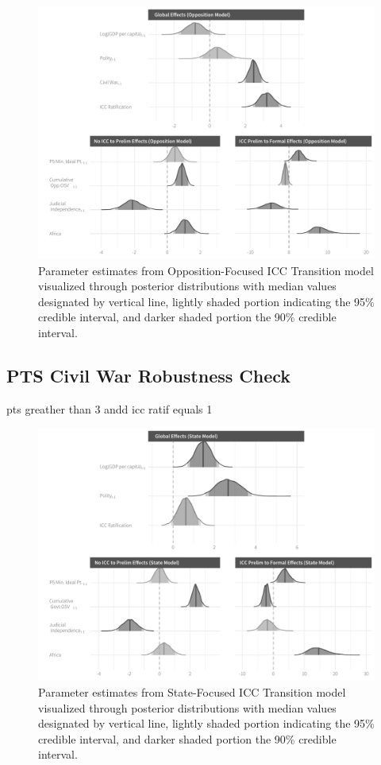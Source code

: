 \begin{figure}
    \centering
    \includegraphics[width=1\textwidth]{rebelCoefSumm_noImp.pdf}
    \caption{Parameter estimates from Opposition-Focused ICC Transition model visualized through posterior distributions with median values designated by vertical line, lightly shaded portion indicating the 95\% credible interval, and darker shaded portion the 90\% credible interval.}
    \label{fig:rebelModel}
\end{figure}

\subsection*{PTS Civil War Robustness Check}

pts greather than 3 andd icc ratif equals 1

\begin{figure}
    \centering
    \includegraphics[width=1\textwidth]{stateCoefSumm_ptsCivilWarOnly.pdf}
    \caption{Parameter estimates from State-Focused ICC Transition model visualized through posterior distributions with median values designated by vertical line, lightly shaded portion indicating the 95\% credible interval, and darker shaded portion the 90\% credible interval.}
    \label{fig:stateModel}
\end{figure}

